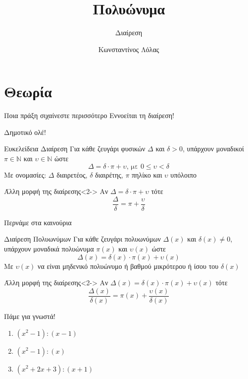 \documentclass{presentation}
\title{Πολυώνυμα}
\subtitle{Διαίρεση}
\author[Λόλας]{Κωνσταντίνος Λόλας}
\date{}
\begin{document}
\begin{frame}
  \titlepage
\end{frame}

\section{Θεωρία}
\begin{frame}{Ποια πράξη σιχαίνεστε περισσότερο}
  Εννοείται τη διαίρεση! 


\end{frame}

\begin{frame}{Δημοτικό ολέ!}
  \begin{block}{Ευκελείδεια Διαίρεση}
    Για κάθε ζευγάρι φυσικών $Δ$ και $δ>0$, υπάρχουν μοναδικοί $π\in\mathbb{N}$ και $υ\in\mathbb{N}$ ώστε
    $$Δ=δ\cdot π+υ \text{, με } 0\le υ <δ$$
    Με ονομασίες: $Δ$ διαιρετέος, $δ$ διαιρέτης, $π$ πηλίκο και $υ$ υπόλοιπο
  \end{block}
  \begin{block}{Άλλη μορφή της διαίρεσης}<2->
    Αν $Δ=δ\cdot π+υ$ τότε
    $$\dfrac{Δ}{δ}=π + \dfrac{υ}{δ}$$
  \end{block}
\end{frame}

\begin{frame}{Περνάμε στα καινούρια}
  \begin{block}{Διαίρεση Πολυωνύμων}
    Για κάθε ζευγάρι πολυωνύμων $Δ(x)$ και $δ(x)\ne 0$, υπάρχουν μοναδικά πολυώνυμα $π(x)$ και $υ(x)$ ώστε
    $$Δ(x)=δ(x)\cdot π(x)+υ(x)$$
    Με $υ(x)$ να είναι μηδενικό πολυώνυμο ή βαθμού μικρότερου ή ίσου του $δ(x)$
  \end{block}
  \begin{block}{Άλλη μορφή της διαίρεσης}<2->
    Αν $Δ(x)=δ(x)\cdot π(x)+υ(x)$ τότε
    $$\dfrac{Δ(x)}{δ(x)}=π(x) + \dfrac{υ(x)}{δ(x)}$$
  \end{block}
\end{frame}

\begin{frame}{Πάμε για γνωστά!}
  \begin{enumerate}
    \item<1-> $(x^2-1):(x-1)$
    \item<2-> $(x^2-1):(x)$
    \item<3-> $(x^2+2x+3):(x+1)$
  \end{enumerate}
\end{frame}
\end{document}
